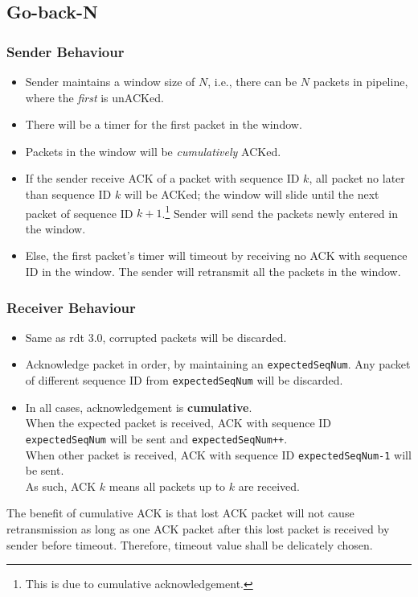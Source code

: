 \documentclass[12pt]{article}
\theoremstyle{definition}
\begin{document}
\subsection{Go-back-N}
\subsubsection{Sender Behaviour}
\begin{itemize}
\item Sender maintains a window size of $N$, i.e., there can be $N$ packets in pipeline, where the \textit{first} is unACKed.
\item There will be a timer for the first packet in the window.
\item Packets in the window will be \textit{cumulatively} ACKed.
\item If the sender receive ACK of a packet with sequence ID $k$, all packet no later than sequence ID $k$ will be ACKed; the window will slide until the next packet of sequence ID $k+1$.\footnote{This is due to cumulative acknowledgement.} Sender will send the packets newly entered in the window.
\item Else, the first packet's timer will timeout by receiving no ACK with sequence ID in the window. The sender will retransmit all the packets in the window.
\end{itemize}
\subsubsection{Receiver Behaviour}
\begin{itemize}
  \item Same as rdt 3.0, corrupted packets will be discarded. 
  \item Acknowledge packet in order, by maintaining an \texttt{expectedSeqNum}. Any packet of different sequence ID from \texttt{expectedSeqNum} will be discarded.
  \item In all cases, acknowledgement is \textbf{cumulative}. \\When the expected packet is received, ACK with sequence ID \texttt{expectedSeqNum} will be sent and \texttt{expectedSeqNum++}.\\When other packet is received, ACK with sequence ID \texttt{expectedSeqNum-1} will be sent.\\
  As such, ACK $k$ means all packets up to $k$ are received.
  \end{itemize}
The benefit of cumulative ACK is that lost ACK packet will not cause retransmission as long as one ACK packet after this lost packet is received by sender before timeout. Therefore, timeout value shall be delicately chosen.\\
\end{document}
